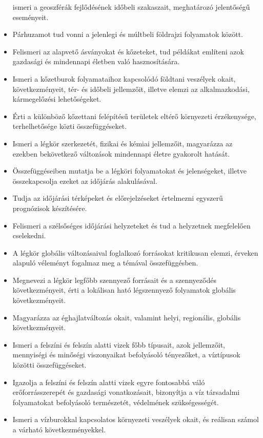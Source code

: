\begin{itemize}
  ismeri a geoszférák fejlődésének időbeli szakaszait, meghatározó
  jelentőségű eseményeit.
\item
  Párhuzamot tud vonni a jelenlegi és múltbeli földrajzi folyamatok
  között.
\item
  Felismeri az alapvető ásványokat és kőzeteket, tud példákat említeni
  azok gazdasági és mindennapi életben való hasznosítására.
\item
  Ismeri a kőzetburok folyamataihoz kapcsolódó földtani veszélyek okait,
  következményeit, tér- és időbeli jellemzőit, illetve elemzi az
  alkalmazkodási, kármegelőzési lehetőségeket.
\item
  Érti a különböző kőzettani felépítésű területek eltérő környezeti
  érzékenysége, terhelhetősége közti összefüggéseket.
\item
  Ismeri a légkör szerkezetét, fizikai és kémiai jellemzőit, magyarázza
  az ezekben bekövetkező változások mindennapi életre gyakorolt hatását.
\item
  Összefüggéseiben mutatja be a légköri folyamatokat és jelenségeket,
  illetve összekapcsolja ezeket az időjárás alakulásával.
\item
  Tudja az időjárási térképeket és előrejelzéseket értelmezni egyszerű
  prognózisok készítésére.
\item
  Felismeri a szélsőséges időjárási helyzeteket és tud a helyzetnek
  megfelelően cselekedni.
\item
  A légkör globális változásaival foglalkozó forrásokat kritikusan
  elemzi, érveken alapuló véleményt fogalmaz meg a témával
  összefüggésben.
\item
  Megnevezi a légkör legfőbb szennyező forrásait és a szennyeződés
  következményeit, érti a lokálisan ható légszennyező folyamatok
  globális következményeit.
\item
  Magyarázza az éghajlatváltozás okait, valamint helyi, regionális,
  globális következményeit.
\item
  Ismeri a felszíni és felszín alatti vizek főbb típusait, azok
  jellemzőit, mennyiségi és minőségi viszonyaikat befolyásoló
  tényezőket, a víztípusok közötti összefüggéseket.
\item
  Igazolja a felszíni és felszín alatti vizek egyre fontosabbá váló
  erőforrásszerepét és gazdasági vonatkozásait, bizonyítja a víz
  társadalmi folyamatokat befolyásoló természetét, védelmének
  szükségességét.
\item
  Ismeri a vízburokkal kapcsolatos környezeti veszélyek okait, és
  reálisan számol a várható következményekkel.

\end{itemize}
